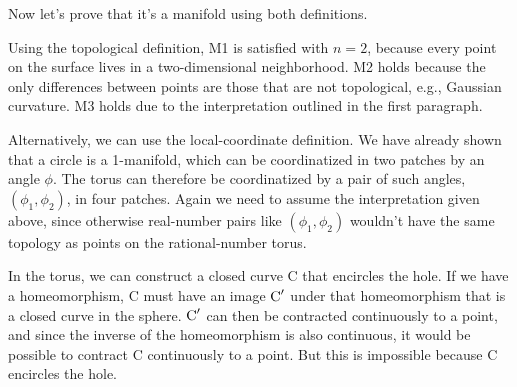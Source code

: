 Now let's prove that it's a manifold using both definitions.

Using the topological definition, M1 is satisfied with $n=2$, because every point on the
surface lives in a two-dimensional neighborhood. M2 holds because the only differences between points are those that are not
topological, e.g., Gaussian curvature. M3 holds due to the interpretation outlined in the first paragraph.

Alternatively, we can use the local-coordinate definition. We have already shown that a circle
is a 1-manifold, which can be coordinatized in two patches by an angle $\phi$. The torus can therefore be coordinatized by
a pair of such angles, $(\phi_1,\phi_2)$, in four patches. Again we need to assume the interpretation given above, since
otherwise real-number pairs like $(\phi_1,\phi_2)$ wouldn't have the same topology as points on the rational-number torus.

In the torus, we can construct a closed curve C that encircles the hole. If we have a homeomorphism, C must have
an image $\textup{C}'$ under that homeomorphism that is a closed curve in the sphere.  $\textup{C}'$ can then be
contracted continuously to a point, and since the inverse of the homeomorphism is also continuous, it would be
possible to contract C continuously to a point. But this is impossible because C encircles the hole.


